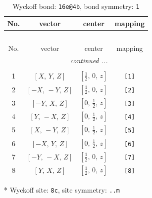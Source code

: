 \documentclass[fleqn,8pt]{jsarticle}
\begin{document}
\begin{longtable}{cccc}
\caption{Wyckoff bond: {\tt 16e@4b}, bond symmetry: {\tt 1}}
 \\
 \hline \hline
No. & vector & center & mapping \\ \hline \endfirsthead

\multicolumn{3}{l}{\tablename\ \thetable{}} \\
 \hline \hline
No. & vector & center & mapping \\ \hline \endhead

 \hline \hline
\multicolumn{3}{r}{\footnotesize\it continued ...} \\ \endfoot

 \hline \hline
\multicolumn{3}{r}{} \\ \endlastfoot

1 & $\left[ X,\, Y,\, Z \right]$ & $\left[ \frac{1}{2},\, 0,\, z \right]$ & {\tt [1]} \\ \hline
2 & $\left[ - X,\, - Y,\, Z \right]$ & $\left[ \frac{1}{2},\, 0,\, z \right]$ & {\tt [2]} \\ \hline
3 & $\left[ - Y,\, X,\, Z \right]$ & $\left[ 0,\, \frac{1}{2},\, z \right]$ & {\tt [3]} \\ \hline
4 & $\left[ Y,\, - X,\, Z \right]$ & $\left[ 0,\, \frac{1}{2},\, z \right]$ & {\tt [4]} \\ \hline
5 & $\left[ X,\, - Y,\, Z \right]$ & $\left[ 0,\, \frac{1}{2},\, z \right]$ & {\tt [5]} \\ \hline
6 & $\left[ - X,\, Y,\, Z \right]$ & $\left[ 0,\, \frac{1}{2},\, z \right]$ & {\tt [6]} \\ \hline
7 & $\left[ - Y,\, - X,\, Z \right]$ & $\left[ \frac{1}{2},\, 0,\, z \right]$ & {\tt [7]} \\ \hline
8 & $\left[ Y,\, X,\, Z \right]$ & $\left[ \frac{1}{2},\, 0,\, z \right]$ & {\tt [8]} \\
\end{longtable}
* Wyckoff site: {\tt 8c}, site symmetry: {\tt ..m}
\renewcommand{\arraystretch}{1.2}
\end{document}
